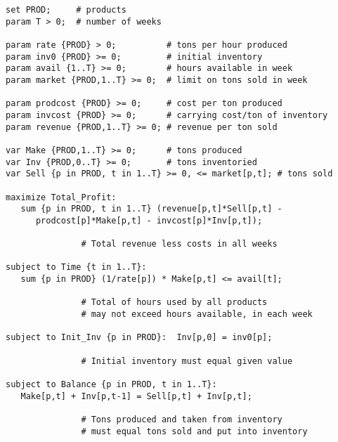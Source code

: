 \begin{lstlisting}
set PROD;     # products
param T > 0;  # number of weeks

param rate {PROD} > 0;          # tons per hour produced
param inv0 {PROD} >= 0;         # initial inventory
param avail {1..T} >= 0;        # hours available in week
param market {PROD,1..T} >= 0;  # limit on tons sold in week

param prodcost {PROD} >= 0;     # cost per ton produced
param invcost {PROD} >= 0;      # carrying cost/ton of inventory
param revenue {PROD,1..T} >= 0; # revenue per ton sold

var Make {PROD,1..T} >= 0;      # tons produced
var Inv {PROD,0..T} >= 0;       # tons inventoried
var Sell {p in PROD, t in 1..T} >= 0, <= market[p,t]; # tons sold

maximize Total_Profit:
   sum {p in PROD, t in 1..T} (revenue[p,t]*Sell[p,t] -
      prodcost[p]*Make[p,t] - invcost[p]*Inv[p,t]);

               # Total revenue less costs in all weeks

subject to Time {t in 1..T}:
   sum {p in PROD} (1/rate[p]) * Make[p,t] <= avail[t];

               # Total of hours used by all products
               # may not exceed hours available, in each week

subject to Init_Inv {p in PROD}:  Inv[p,0] = inv0[p];

               # Initial inventory must equal given value

subject to Balance {p in PROD, t in 1..T}:
   Make[p,t] + Inv[p,t-1] = Sell[p,t] + Inv[p,t];

               # Tons produced and taken from inventory
               # must equal tons sold and put into inventory
\end{lstlisting}
